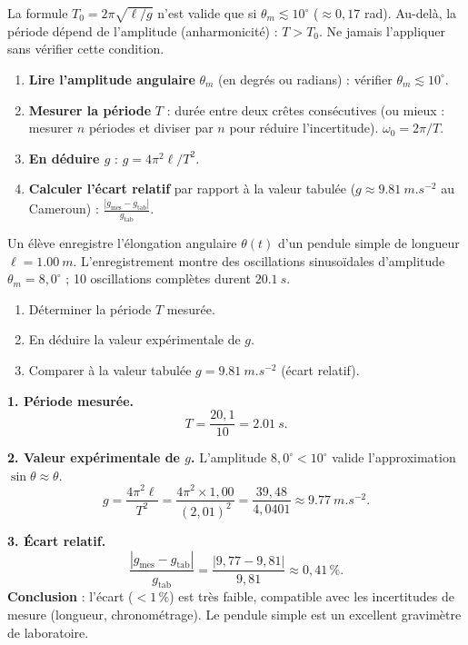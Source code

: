 \documentclass[11pt]{article}
\begin{document}
\begin{attention}
La formule $T_0 = 2\pi\sqrt{\ell/g}$ n'est valide que si $\theta_m \lesssim 10^\circ$ ($\approx 0,17$ rad). Au-delà, la période dépend de l'amplitude (anharmonicité) : $T > T_0$. Ne jamais l'appliquer sans vérifier cette condition.
\end{attention}

\begin{methode}
\begin{enumerate}
\item \textbf{Lire l'amplitude angulaire} $\theta_m$ (en degrés ou radians) : vérifier $\theta_m \lesssim 10^\circ$.
\item \textbf{Mesurer la période} $T$ : durée entre deux crêtes consécutives (ou mieux : mesurer $n$ périodes et diviser par $n$ pour réduire l'incertitude). $\omega_0 = 2\pi/T$.
\item \textbf{En déduire $g$} : $g = 4\pi^2\ell/T^2$.
\item \textbf{Calculer l'écart relatif} par rapport à la valeur tabulée ($g \approx \SI{9,81}{m.s^{-2}}$ au Cameroun) : $\frac{|g_{\text{mes}}-g_{\text{tab}}|}{g_{\text{tab}}}$.
\end{enumerate}
\end{methode}

\begin{exoresolu}
Un élève enregistre l'élongation angulaire $\theta(t)$ d'un pendule simple de longueur $\ell = \SI{1,00}{m}$. L'enregistrement montre des oscillations sinusoïdales d'amplitude $\theta_m = 8,0^\circ$ ; 10 oscillations complètes durent $\SI{20,1}{s}$.
\begin{enumerate}
\item Déterminer la période $T$ mesurée.
\item En déduire la valeur expérimentale de $g$.
\item Comparer à la valeur tabulée $g = \SI{9,81}{m.s^{-2}}$ (écart relatif).
\end{enumerate}
\tcblower
\textbf{1. Période mesurée.}
\[ T = \frac{20{,}1}{10} = \SI{2,01}{s}. \]

\textbf{2. Valeur expérimentale de $g$.}
L'amplitude $8,0^\circ < 10^\circ$ valide l'approximation $\sin\theta \approx \theta$.
\[ g = \frac{4\pi^2\ell}{T^2} = \frac{4\pi^2\times 1{,}00}{(2{,}01)^2} = \frac{39{,}48}{4{,}0401} \approx \SI{9,77}{m.s^{-2}}. \]

\textbf{3. Écart relatif.}
\[ \frac{|g_{\text{mes}} - g_{\text{tab}}|}{g_{\text{tab}}} = \frac{|9{,}77 - 9{,}81|}{9{,}81} \approx 0{,}41\,\%. \]
\textbf{Conclusion} : l'écart ($< 1\,\%$) est très faible, compatible avec les incertitudes de mesure (longueur, chronométrage). Le pendule simple est un excellent gravimètre de laboratoire.
\end{exoresolu}
\end{document}
